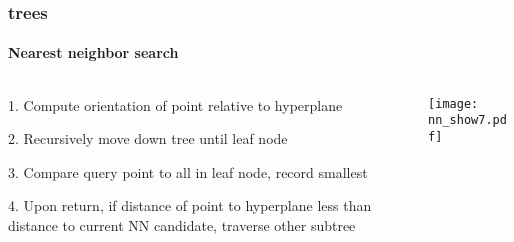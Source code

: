 \begin{frame}[noframenumbering]
  \frametitle{\kd trees}
  \framesubtitle{Nearest neighbor search}
  \begin{columns}[T]
    \begin{column}{.5\textwidth}
      \begin{block}{}%
        {\color{white} 1.\hspace{1mm} Compute orientation of point relative to hyperplane
          \\\vspace{0.4cm}
        
        2.\hspace{1mm} Recursively move down tree until leaf node\\\vspace{0.4cm}
        
        {\color{graph-red}
        3.\hspace{1mm} Compare query point to all in leaf node, record smallest}\\\vspace{0.4cm}
    
        4.\hspace{1mm} Upon return, if distance of point to hyperplane less than distance to current
          NN candidate, traverse other subtree}
      \end{block}
    \end{column}
    \begin{column}{.5\textwidth}
      \begin{block}{}
        \texttt{[image: nn\_show7.pdf]}
      \end{block}
    \end{column}
  \end{columns}
\end{frame}
